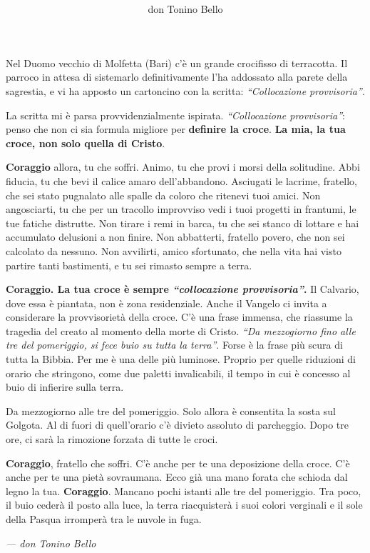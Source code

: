 \documentclass[a4paper, 12pt]{article}
\title{
	\Huge{\MyTitle}
}
\author{don Tonino Bello}
\date{}
\begin{document}
	\maketitle
	
	Nel Duomo vecchio di Molfetta (Bari) c'è un grande crocifisso di terracotta. Il parroco in attesa di sistemarlo definitivamente l'ha addossato alla parete della sagrestia, e vi ha apposto un cartoncino con la scritta: \textit{``Collocazione provvisoria''}.

    La scritta mi è parsa provvidenzialmente ispirata.
    \textit{``Collocazione provvisoria''}: penso che non ci sia formula migliore per \textbf{definire la croce}.
    \textbf{La mia, la tua croce, non solo quella di Cristo}.

    \textbf{Coraggio} allora, tu che soffri.
    Animo, tu che provi i morsi della solitudine.
    Abbi fiducia, tu che bevi il calice amaro dell'abbandono.
    Asciugati le lacrime, fratello, che sei stato pugnalato alle spalle da coloro che ritenevi tuoi amici.
    Non angosciarti, tu che per un tracollo improvviso vedi i tuoi progetti in frantumi, le tue fatiche distrutte.
    Non tirare i remi in barca, tu che sei stanco di lottare e hai accumulato delusioni a non finire.
    Non abbatterti, fratello povero, che non sei calcolato da nessuno.
    Non avvilirti, amico sfortunato, che nella vita hai visto partire tanti bastimenti, e tu sei rimasto sempre a terra.

    \textbf{Coraggio. La tua croce è sempre \textit{``collocazione provvisoria''}.}
    Il Calvario, dove essa è piantata, non è zona residenziale.
    Anche il Vangelo ci invita a considerare la provvisorietà della croce.
    C'è una frase immensa, che riassume la tragedia del creato al momento della morte di Cristo.
    \textit{``Da mezzogiorno fino alle tre del pomeriggio, si fece buio su tutta la terra''}.
    Forse è la frase più scura di tutta la Bibbia.
    Per me è una delle più luminose.
    Proprio per quelle riduzioni di orario che stringono, come due paletti invalicabili, il tempo in cui è concesso al buio di infierire sulla terra.

    Da mezzogiorno alle tre del pomeriggio.
    Solo allora è consentita la sosta sul Golgota.
    Al di fuori di quell'orario c'è divieto assoluto di parcheggio.
    Dopo tre ore, ci sarà la rimozione forzata di tutte le croci.

    \textbf{Coraggio}, fratello che soffri.
    C'è anche per te una deposizione della croce.
    C'è anche per te una pietà sovraumana.
    Ecco già una mano forata che schioda dal legno la tua.
    \textbf{Coraggio}.
    Mancano pochi istanti alle tre del pomeriggio.
    Tra poco, il buio cederà il posto alla luce, la terra riacquisterà i suoi colori verginali e il sole della Pasqua irromperà tra le nuvole in fuga.

	\bigskip
	
	\raggedleft \textit{--- don Tonino Bello} \hspace{1em}
\end{document}
